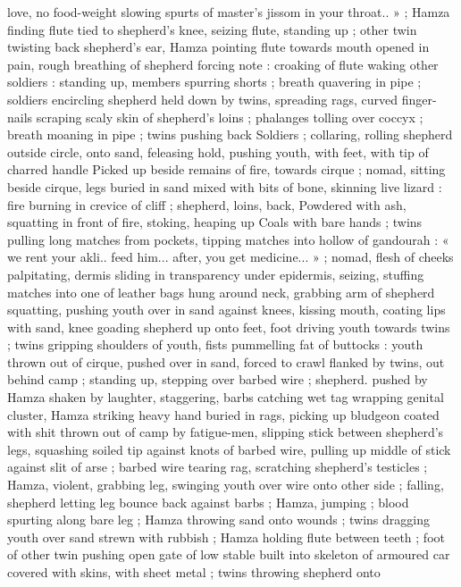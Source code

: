 love, no food-weight slowing spurts of master’s jissom in your
throat.. » ; Hamza finding flute tied to shepherd's knee, seizing flute,
standing up ; other twin twisting back shepherd's ear, Hamza pointing
flute towards mouth opened in pain, rough breathing of shepherd
forcing note : croaking of flute waking other soldiers : standing up,
members spurring shorts ; breath quavering in pipe ; soldiers
encircling shepherd held down by twins, spreading rags, curved
finger-nails scraping scaly skin of shepherd's loins ; phalanges
tolling over coccyx ; breath moaning in pipe ; twins pushing back
Soldiers ; collaring, rolling shepherd outside circle, onto sand,
feleasing hold, pushing youth, with feet, with tip of charred handle
Picked up beside remains of fire, towards cirque ; nomad, sitting
beside cirque, legs buried in sand mixed with bits of bone, skinning
live lizard : fire burning in crevice of cliff ; shepherd, loins, back,
Powdered with ash, squatting in front of fire, stoking, heaping up
Coals with bare hands ; twins pulling long matches from pockets,
tipping matches into hollow of gandourah : « we rent your akli.. feed
him... after, you get medicine... » ; nomad, flesh of cheeks palpitating,
dermis sliding in transparency under epidermis, seizing, stuffing
matches into one of leather bags hung around neck, grabbing arm of
shepherd squatting, pushing youth over in sand against knees,
kissing mouth, coating lips with sand, knee goading shepherd up
onto feet, foot driving youth towards twins ; twins gripping shoulders
of youth, fists pummelling fat of buttocks : youth thrown out of
cirque, pushed over in sand, forced to crawl flanked by twins, out
behind camp ; standing up, stepping over barbed wire ; shepherd.
pushed by Hamza shaken by laughter, staggering, barbs catching wet
tag wrapping genital cluster, Hamza striking heavy hand buried in
rags, picking up bludgeon coated with shit thrown out of camp by
fatigue-men, slipping stick between shepherd's legs, squashing
soiled tip against knots of barbed wire, pulling up middle of stick
against slit of arse ; barbed wire tearing rag, scratching shepherd's
testicles ; Hamza, violent, grabbing leg, swinging youth over wire
onto other side ; falling, shepherd letting leg bounce back against
barbs ; Hamza, jumping ; blood spurting along bare leg ; Hamza
throwing sand onto wounds ; twins dragging youth over sand strewn
with rubbish ; Hamza holding flute between teeth ; foot of other twin
pushing open gate of low stable built into skeleton of armoured car
covered with skins, with sheet metal ; twins throwing shepherd onto
